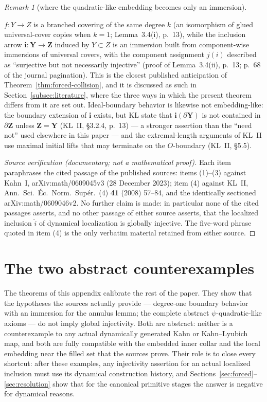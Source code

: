 \documentclass[11pt,reqno]{amsart}
\theoremstyle{definition}
\theoremstyle{remark}
\newtheorem{remark}[theorem]{Remark}
\begin{document}
\begin{remark}[where the quadratic-like embedding becomes only an immersion]
\begin{enumerate}
\(f\colon Y\to Z\) is a branched covering of the same degree \(k\) (an
isomorphism of glued universal-cover copies when \(k=1\);
Lemma~3.4(i), p.~13), while the inclusion arrow
\(\mathbf i\colon\mathbf Y\to\mathbf Z\) induced by \(Y\subset Z\) is
an immersion built from component-wise immersions of universal covers,
with the component assignment \(j(i)\) described as ``surjective but
not necessarily injective'' (proof of Lemma~3.4(ii), p.~13; p.~68 of
the journal pagination).  This is the closest published anticipation of
Theorem~\ref{thm:forced-collision}, and it is discussed as such in
Section~\ref{subsec:literature}, where the three ways in which the
present theorem differs from it are set out.  Ideal-boundary behavior
is likewise not embedding-like: the boundary extension of
\(\mathbf i\) exists, but KL state that
\(\mathbf i(\partial\mathbf Y)\) is not contained in
\(\partial\mathbf Z\) unless \(\mathbf Z=\mathbf Y\)
(KL~II, \S3.2.4, p.~13) --- a stronger assertion than the ``need not''
used elsewhere in this paper --- and the extremal-length
arguments of KL~II use maximal initial lifts that may terminate on the
\(O\)-boundary (KL~II, \S5.5).
\end{enumerate}
\end{remark}

\begin{proof}[Source verification (documentary; not a mathematical proof)]
Each item paraphrases the cited passage of the published sources:
items (1)--(3) against Kahn~I, arXiv:math/0609045v3 (28 December 2023);
item (4) against KL~II, Ann.\ Sci.\ \'Ec.\ Norm.\ Sup\'er.\ (4)
\textbf{41} (2008) 57--84, and the identically sectioned
arXiv:math/0609046v2.  No further claim is made: in
particular none of the cited passages asserts, and no other passage of
either source asserts, that the localized inclusion
\(\widehat i\) of dynamical localization is globally injective.  The
five-word phrase quoted in item (4) is the only verbatim material
retained from either source.
\end{proof}

\section{The two abstract counterexamples}
\label{sec:abstract}

The theorems of this appendix calibrate the rest of the paper.  They
show that the hypotheses the sources actually provide --- degree-one
boundary behavior with an immersion for the annulus lemma; the complete
abstract $\psi$-quadratic-like axioms --- do not imply global
injectivity.  Both are abstract: neither is a counterexample to any
actual dynamically generated Kahn or Kahn--Lyubich map, and both are
fully compatible with the embedded inner collar and the local embedding
near the filled set that the sources prove.  Their role is to close
every shortcut: after these examples, any injectivity assertion for an
actual localized inclusion must use its dynamical construction history,
and Sections~\ref{sec:forced}--\ref{sec:resolution} show that for the
canonical primitive stages the answer is negative for dynamical
reasons.
\end{document}
